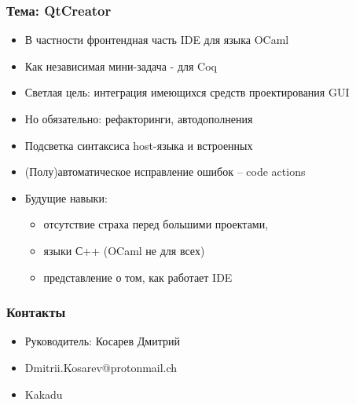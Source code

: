 \documentclass{beamer}
\begin{document}
\begin{frame}
  \transwipe[direction=90]
  \frametitle{Тема: QtCreator}
  \begin{itemize}
    \item В частности фронтендная часть IDE для языка OCaml 
    \item Как независимая мини-задача - для Coq
    \item Светлая цель: интеграция имеющихся средств проектирования GUI
    \item Но обязательно: рефакторинги, автодополнения
    \item Подсветка синтаксиса host-языка и встроенных
    \item (Полу)автоматическое исправление ошибок -- code actions
    \item Будущие навыки: 
        \begin{itemize}
          \item отсутствие страха перед большими проектами, 
          \item языки С++ (OCaml не для всех)
          \item представление о том, как работает IDE
        \end{itemize}
  \end{itemize}
\end{frame}

\begin{frame}
  \transwipe[direction=90]
  \frametitle{Контакты}
  \begin{itemize}
    \item Руководитель: Косарев Дмитрий
    \item Dmitrii.Kosarev@protonmail.ch
    \item \faGithub Kakadu
  \end{itemize}
\end{frame}
\end{document}
